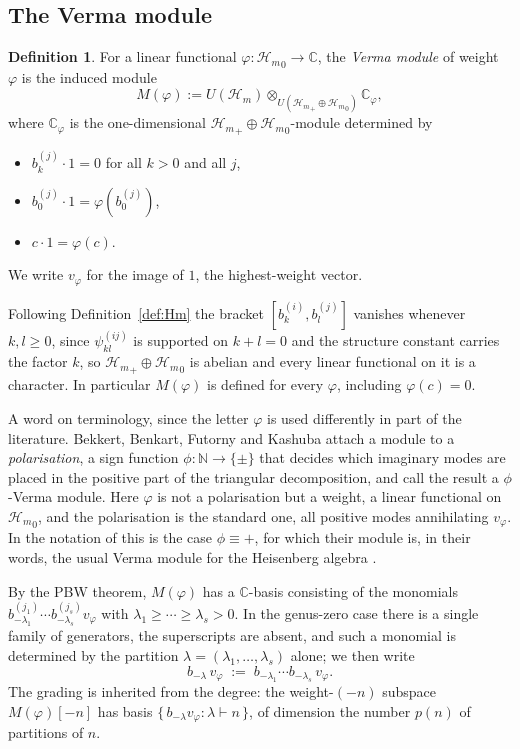 \documentclass[12pt]{amsart}
\theoremstyle{plain}
\theoremstyle{definition}
\newtheorem{definition}[theorem]{Definition}
\newcommand{\CC}{\mathbb{C}}
\newcommand{\NN}{\mathbb{N}}
\newcommand{\Hm}{{\mathcal{H}_m}}     %
\newcommand{\Mf}{M(\varphi)}          %
\newcommand{\vf}{v_\varphi}           %
\begin{document}
\subsection{The Verma module}
\label{subsec:verma}

\begin{definition}
\label{def:verma}
For a linear functional $\varphi : \Hm_0 \to \CC$, the \emph{Verma
module} of weight $\varphi$ is the induced module
\[
  \Mf := U(\Hm) \otimes_{U(\Hm_+ \oplus \Hm_0)} \CC_\varphi,
\]
where $\CC_\varphi$ is the one-dimensional $\Hm_+ \oplus \Hm_0$-module
determined by
\begin{itemize}
  \item $b_k^{(j)} \cdot 1 = 0$ for all $k > 0$ and all $j$,
  \item $b_0^{(j)} \cdot 1 = \varphi(b_0^{(j)})$,
  \item $c \cdot 1 = \varphi(c)$.
\end{itemize}
We write $\vf$ for the image of $1$, the highest-weight vector.
\end{definition}

Following Definition~\ref{def:Hm}
the bracket $[b_k^{(i)}, b_l^{(j)}]$ vanishes whenever $k, l \geq 0$,
since $\psi^{(ij)}_{kl}$ is supported on $k+l=0$ and the structure
constant carries the factor $k$, so $\Hm_+ \oplus \Hm_0$ is abelian and
every linear functional on it is a character. In particular $\Mf$ is
defined for every $\varphi$, including $\varphi(c) = 0$.

A word on terminology, since the letter $\varphi$ is used differently in
part of the literature. Bekkert, Benkart, Futorny and Kashuba
\cite{BBFK2013} attach a module to a \emph{polarisation}, a sign
function $\phi\colon\NN\to\{\pm\}$ that decides which imaginary modes
are placed in the positive part of the triangular decomposition, and
call the result a $\phi$-Verma module. Here $\varphi$ is not a
polarisation but a weight, a linear functional on $\Hm_0$, and the
polarisation is the standard one, all positive modes annihilating
$\vf$. In the notation of \cite{BBFK2013} this is the case
$\phi \equiv +$, for which their module is, in their words, the usual
Verma module for the Heisenberg algebra \cite[\S 3.1]{BBFK2013}. 

By the PBW theorem, $\Mf$ has a $\CC$-basis consisting of the monomials
$b_{-\lambda_1}^{(j_1)} \cdots b_{-\lambda_s}^{(j_s)} \vf$ with
$\lambda_1 \geq \cdots \geq \lambda_s > 0$. In the genus-zero case
there is a single family of generators, the superscripts are absent, and
such a monomial is determined by the partition
$\lambda = (\lambda_1,\dots,\lambda_s)$ alone; we then write
\begin{equation}\label{eq:pbw-partition}
  b_{-\lambda}\,\vf \;:=\; b_{-\lambda_1}\cdots b_{-\lambda_s}\,\vf .
\end{equation}
The grading is inherited from the degree: the weight-$(-n)$ subspace
$\Mf[-n]$ has basis $\{\,b_{-\lambda}\vf : \lambda \vdash n\,\}$, of
dimension the number $p(n)$ of partitions of $n$.
\end{document}
